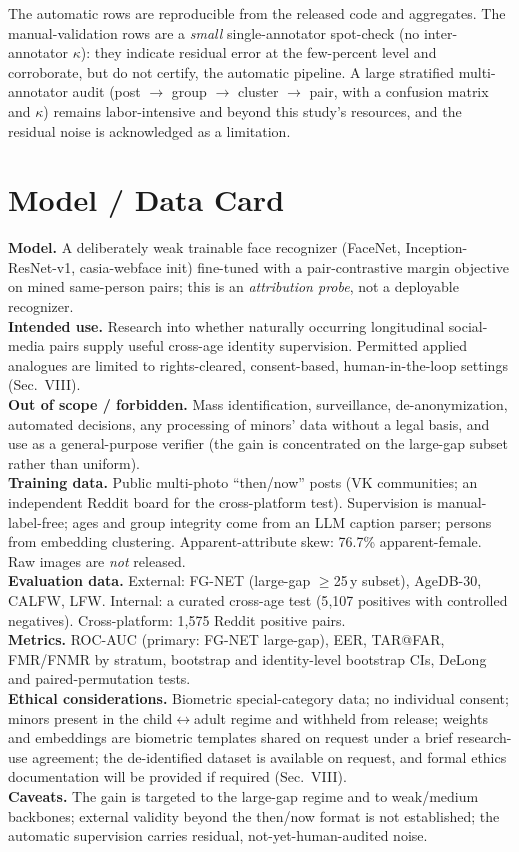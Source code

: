 \documentclass[journal]{IEEEtran}
\newcommand{\dgr}{$\leftrightarrow$}
\begin{document}
The automatic rows are reproducible from the released code and aggregates. The manual-validation rows
are a \emph{small} single-annotator spot-check (no inter-annotator $\kappa$): they indicate residual
error at the few-percent level and corroborate, but do not certify, the automatic pipeline. A large
stratified multi-annotator audit (post $\to$ group $\to$ cluster $\to$ pair, with a confusion matrix and
$\kappa$) remains labor-intensive and beyond this study's resources, and the residual noise is
acknowledged as a limitation.

\section{Model / Data Card}\label{sec:card}
\noindent\textbf{Model.} A deliberately weak trainable face recognizer (FaceNet, Inception-ResNet-v1,
casia-webface init) fine-tuned with a pair-contrastive margin objective on mined same-person pairs;
this is an \emph{attribution probe}, not a deployable recognizer.\\
\textbf{Intended use.} Research into whether naturally occurring longitudinal social-media pairs supply
useful cross-age identity supervision. Permitted applied analogues are limited to rights-cleared,
consent-based, human-in-the-loop settings (Sec.~VIII).\\
\textbf{Out of scope / forbidden.} Mass identification, surveillance, de-anonymization, automated
decisions, any processing of minors' data without a legal basis, and use as a general-purpose verifier
(the gain is concentrated on the large-gap subset rather than uniform).\\
\textbf{Training data.} Public multi-photo ``then/now'' posts (VK communities; an independent Reddit
board for the cross-platform test). Supervision is manual-label-free; ages and group integrity come
from an LLM caption parser; persons from embedding clustering. Apparent-attribute skew: 76.7\%
apparent-female. Raw images are \emph{not} released.\\
\textbf{Evaluation data.} External: FG-NET (large-gap $\geq$25\,y subset), AgeDB-30, CALFW, LFW. Internal:
a curated cross-age test (5{,}107 positives with controlled negatives). Cross-platform: 1{,}575 Reddit
positive pairs.\\
\textbf{Metrics.} ROC-AUC (primary: FG-NET large-gap), EER, TAR@FAR, FMR/FNMR by stratum, bootstrap and
identity-level bootstrap CIs, DeLong and paired-permutation tests.\\
\textbf{Ethical considerations.} Biometric special-category data; no individual consent; minors present
in the child\dgr adult regime and withheld from release; weights and embeddings are biometric templates
shared on request under a brief research-use agreement; the de-identified dataset is available on request, and formal ethics documentation will be provided if required (Sec.~VIII).\\
\textbf{Caveats.} The gain is targeted to the large-gap regime and to weak/medium backbones; external
validity beyond the then/now format is not established; the automatic supervision carries residual,
not-yet-human-audited noise.
\end{document}
